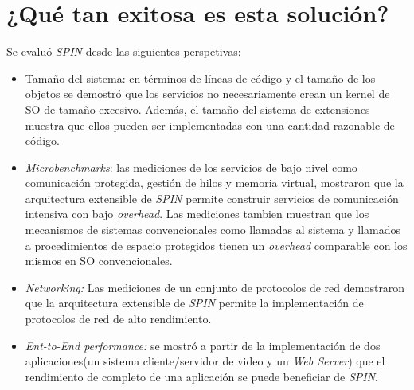 \section{¿Qué tan exitosa es esta solución?} 
Se evaluó \textit{SPIN} desde las siguientes perspetivas:
\begin{itemize}
    \item Tamaño del sistema: en términos de líneas de código y el tamaño de los objetos se demostró que los servicios no necesariamente crean un kernel de SO de tamaño excesivo. Además, el tamaño del sistema de extensiones muestra que ellos pueden ser implementadas con una cantidad razonable de código.
    \item \textit{Microbenchmarks}: las mediciones de los servicios de bajo nivel como comunicación protegida, gestión de hilos y memoria virtual, mostraron que la arquitectura extensible de \textit{SPIN} permite construir servicios de comunicación intensiva con bajo \textit{overhead}. Las mediciones tambien muestran que los mecanismos de sistemas convencionales como llamadas al sistema y llamados a procedimientos de espacio protegidos tienen un \textit{overhead} comparable con los mismos en SO convencionales.
    \item \textit{Networking:} Las mediciones de un conjunto de protocolos de red demostraron que la arquitectura extensible de \textit{SPIN} permite la implementación de protocolos de red de alto rendimiento.
    \item \textit{Ent-to-End performance:} se mostró a partir de la implementación de dos aplicaciones(un sistema cliente/servidor de video y un \textit{Web Server}) que el rendimiento de completo de una aplicación se puede beneficiar de \textit{SPIN}.  
\end{itemize}

